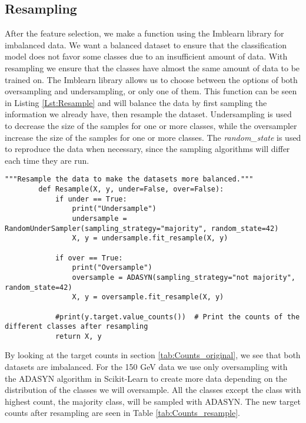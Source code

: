 \documentclass[a4paper, american, 12pt]{report}
\begin{document}
	\subsection{Resampling}
	\label{subsect:Method-Resampling}
	 After the feature selection, we make a function using the Imblearn\cite{Imblearn} library for imbalanced data. We want a balanced dataset to ensure that the classification model does not favor some classes due to an insufficient amount of data. With resampling we ensure that the classes have almost the same amount of data to be trained on. The Imblearn library allows us to choose between the options of both oversampling and undersampling, or only one of them. This function can be seen in Listing \ref{Lst:Resample} and will balance the data by first sampling the information we already have, then resample the dataset. Undersampling is used to decrease the size of the samples for one or more classes, while the oversampler increase the size of the samples for one or more classes. The \textit{random\_state} is used to reproduce the data when necessary, since the sampling algorithms will differ each time they are run.
	\begin{lstlisting}[caption=Function for resampling and balancing the amount of data., label=Lst:Resample]
		"""Resample the data to make the datasets more balanced."""
		def Resample(X, y, under=False, over=False):
			if under == True:
				print("Undersample")
				undersample = RandomUnderSampler(sampling_strategy="majority", random_state=42)
				X, y = undersample.fit_resample(X, y)
		
			if over == True:
				print("Oversample")
				oversample = ADASYN(sampling_strategy="not majority", random_state=42)
				X, y = oversample.fit_resample(X, y)
		
			#print(y.target.value_counts())  # Print the counts of the different classes after resampling
			return X, y 
	\end{lstlisting}

	By looking at the target counts in section \ref{tab:Counts_original}, we see that both datasets are imbalanced. For the 150 GeV data we use only oversampling with the ADASYN algorithm in Scikit-Learn to create more data depending on the distribution of the classes we will oversample. All the classes except the class with highest count, the majority class, will be sampled with ADASYN. The new target counts after resampling are seen in Table \ref{tab:Counts_resample}.
	
\end{document}
